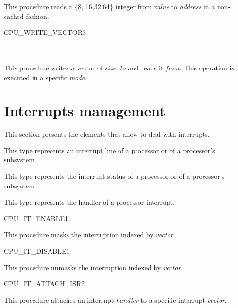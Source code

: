 This procedure reads a \{8, 16,32,64\} integer from \emph {value}
to \emph {address} in a non-cached fashion.

\begin{procedure}{CPU\_WRITE\_VECTOR}{3}
	\\
	\\
	\\
\end{procedure}

This procedure writes a vector of \emph{size}, \emph{to} and reads
it \emph{from}. This operation is executed in a specific \emph{mode}.

\skipoff
\section {Interrupts management}
This section presents the elements that allow to deal with interrupts.
\skipon


This type represents an interrupt line of a processor or of a processor's
subsystem.


This type represents the interrupt status of a processor or of a processor's
subsystem.


This type represents the handler of a processor interrupt.

\begin{procedure}{CPU\_IT\_ENABLE}{1}
\end{procedure}

This procedure masks the interruption indexed by \emph{vector}.

\begin{procedure}{CPU\_IT\_DISABLE}{1}
\end{procedure}

This procedure unmasks the interruption indexed by \emph{vector}.

\begin{procedure}{CPU\_IT\_ATTACH\_ISR}{2}
	\\
\end{procedure}

This procedure attaches an interrupt \emph{handler} to a specific
interrupt \emph{vector}.

